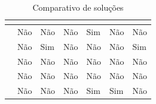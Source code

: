 \documentclass[
	12pt,				%
	openright,			%
	oneside,			%
	a4paper,			%
	english,			%
	french,				%
	spanish,			%
	brazil,				%
	]{abntex2}
\begin{document}
\begin{table}[h!]
\centering
\caption{Comparativo de soluções}
\label{my-label}
\begin{tabular}{M|L|L|L|L|L|L}
\hline
\textbf{}			&       &       &       &       &       &       \\ \hline
\cite{George2012}		& Não                                               & Não                                                                          & Não                                                 & Sim                                                             & Não                                                       & Não                                                                  \\ \hline
\cite{Poisel2013}		& Não                                               & Sim                                                                          & Não                                                 & Não                                                             & Não                                                       & Sim                                                                  \\ \hline
\cite{Dykstra2013}		& Não                                               & Não                                                                          & Não                                                 & Não                                                             & Não                                                       & Não                                                                  \\ \hline
\cite{Do2014}			& Não                                               & Não                                                                          & Não                                                 & Não                                                             & Não                                                       & Não                                                                  \\ \hline
\cite{Reichert2015}		& Não                                               & Não                                                                          & Não                                                 & Sim                                                             & Sim                                                       & Não                                                                  \\ \hline

\end{tabular}
\end{table}
\end{document}
